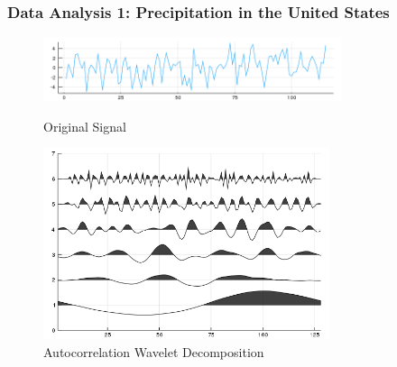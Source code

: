 \documentclass[aspectratio=169]{beamer}
\begin{document}
\begin{frame}
\frametitle{Data Analysis 1: Precipitation in the United States}
    \begin{figure}
        \centering
        \includegraphics[height=0.17\textheight,width=0.78\textwidth]{precip.png}
        \caption{Original Signal}
        \includegraphics[height=0.45\textheight,width=0.75\textwidth]{precip_wiggle.png}
        \caption{Autocorrelation Wavelet Decomposition}
    \end{figure}
\end{frame}
\end{document}
